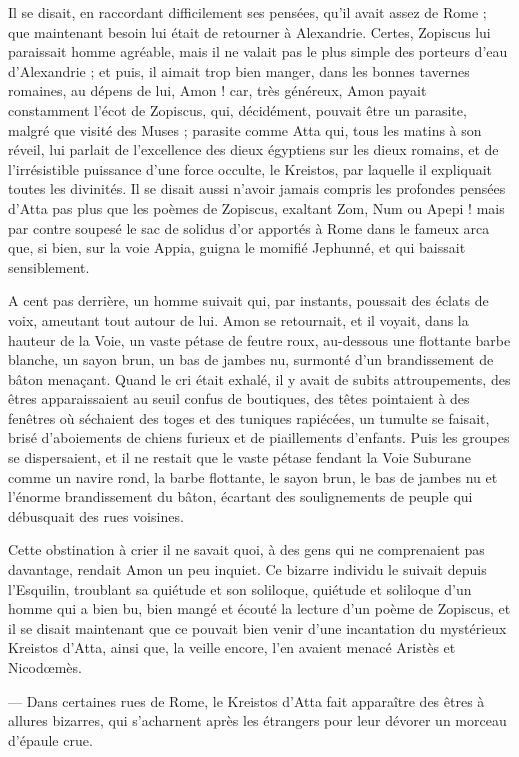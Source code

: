 \documentclass[a4paper, 11pt, oneside, polutonikogreek, french]{article}
\begin{document}
Il se disait, en raccordant difficilement ses pensées, qu'il avait assez de Rome ; que maintenant besoin lui était de retourner à Alexandrie. Certes, Zopiscus lui paraissait homme agréable, mais il ne valait pas le plus simple des porteurs d'eau d'Alexandrie ; et puis, il aimait trop bien manger, dans les bonnes tavernes romaines, au dépens de lui, Amon ! car, très généreux, Amon payait constamment l'écot de Zopiscus, qui, décidément, pouvait être un parasite, malgré que visité des Muses ; parasite comme Atta qui, tous les matins à son réveil, lui parlait de l'excellence des dieux égyptiens sur les dieux romains, et de l'irrésistible puissance d'une force occulte, le Kreistos, par laquelle il expliquait toutes les divinités. Il se disait aussi n'avoir jamais compris les profondes pensées d'Atta pas plus que les poèmes de Zopiscus, exaltant Zom, Num ou Apepi ! mais par contre soupesé le sac de solidus d'or apportés à Rome dans le fameux arca que, si bien, sur la voie Appia, guigna le momifié Jephunné, et qui baissait sensiblement.

A cent pas derrière, un homme suivait qui, par instants, poussait des éclats de voix, ameutant tout autour de lui. Amon se retournait, et il voyait, dans la hauteur de la Voie, un vaste pétase de feutre roux, au-dessous une flottante barbe blanche, un sayon brun, un bas de jambes nu, surmonté d'un brandissement de bâton menaçant. Quand le cri était exhalé, il y avait de subits attroupements, des êtres apparaissaient au seuil confus de boutiques, des têtes pointaient à des fenêtres où séchaient des toges et des tuniques rapiécées, un tumulte se faisait, brisé d'aboiements de chiens furieux et de piaillements d'enfants. Puis les groupes se dispersaient, et il ne restait que le vaste pétase fendant la Voie Suburane comme un navire rond, la barbe flottante, le sayon brun, le bas de jambes nu et l'énorme brandissement du bâton, écartant des soulignements de peuple qui débusquait des rues voisines.

Cette obstination à crier il ne savait quoi, à des gens qui ne comprenaient pas davantage, rendait Amon un peu inquiet. Ce bizarre individu le suivait depuis l'Esquilin, troublant sa quiétude et son soliloque, quiétude et soliloque d'un homme qui a bien bu, bien mangé et écouté la lecture d'un poème de Zopiscus, et il se disait maintenant que ce pouvait bien venir d'une incantation du mystérieux Kreistos d'Atta, ainsi que, la veille encore, l'en avaient menacé Aristès et Nicodœmès.

--- Dans certaines rues de Rome, le Kreistos d'Atta fait apparaître des êtres à allures bizarres, qui s'acharnent après les étrangers pour leur dévorer un morceau d'épaule crue.
\end{document}
